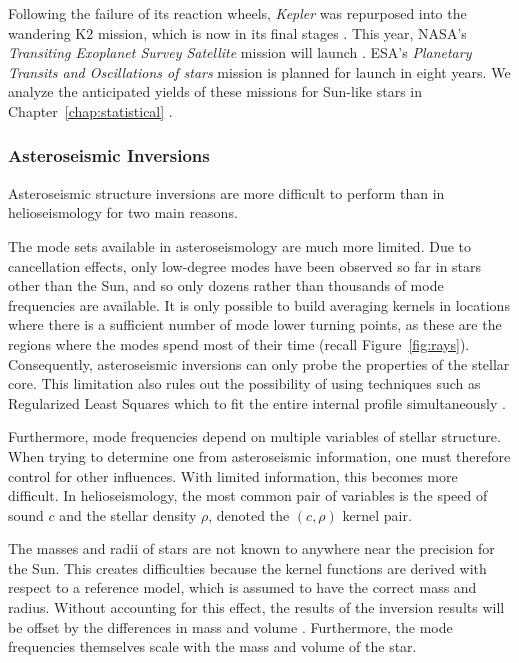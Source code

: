 Following the failure of its reaction wheels, \emph{Kepler} was repurposed into the wandering K2 mission, which is now in its final stages \citep[][duration 2013--2018]{2014PASP..126..398H}. 
This year, NASA's \emph{Transiting Exoplanet Survey Satellite} mission will launch \citep[TESS,][expected 2018--2020]{2010AAS...21545006R}. 
ESA's \emph{Planetary Transits and Oscillations of stars} mission \citep[PLATO,][expected 2026--2030]{2014ExA....38..249R} is planned for launch in eight years. 
We analyze the anticipated yields of these missions for Sun-like stars in Chapter~\ref{chap:statistical} \citep{2017apj...839..116a}. 



\subsubsection*{Asteroseismic Inversions}

Asteroseismic structure inversions are more difficult to perform than in helioseismology for two main reasons. 
\begin{description}
    \setlength{\itemindent}{0pt}
    \item[Mode set.]
    The mode sets available in asteroseismology are much more limited. 
    Due to cancellation effects, only low-degree modes have been observed so far in stars other than the Sun, and so only dozens rather than thousands of mode frequencies are available. 
    It is only possible to build averaging kernels in locations where there is a sufficient number of mode lower turning points, as these are the regions where the modes spend most of their time (recall Figure~\ref{fig:rays}). 
    Consequently, asteroseismic inversions can only probe the properties of the stellar core. 
    This limitation also rules out the possibility of using techniques such as Regularized Least Squares which to fit the entire internal profile simultaneously \citep[see, e.g.,][]{basuchaplin2017}. 
    
    Furthermore, mode frequencies depend on multiple variables of stellar structure.
    When trying to determine one from asteroseismic information, one must therefore control for other influences. 
    With limited information, this becomes more difficult. 
    In helioseismology, the most common pair of variables is the speed of sound $c$ and the stellar density $\rho$, denoted the ${(c,\rho)}$ kernel pair. 
    
    \item[Mass and radius.]
    The masses and radii of stars are not known to anywhere near the precision for the Sun. 
    This creates difficulties because the kernel functions are derived with respect to a reference model, which is assumed to have the correct mass and radius. 
    Without accounting for this effect, the results of the inversion results will be offset by the differences in mass and volume \citep[][]{2003Ap&SS.284..153B}. 
    Furthermore, the mode frequencies themselves scale with the mass and volume of the star. 
\end{description}

